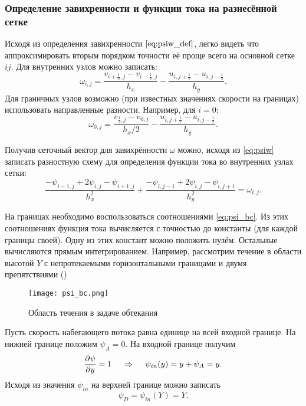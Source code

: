 \subsubsection{Определение завихренности и функции тока на разнесённой сетке}

Исходя из определения завихренности $\eqref{eq:psiw_def}$, легко видеть
что аппроксимировать вторым порядком точности её проще всего на основной сетке $ij$.
Для внутренних узлов можно записать:
\begin{equation}
    \label{eq:omega_approx}
    \omega_{i,j} = \frac{v_{i+\tfrac12,j} - v_{i-\tfrac12,j}}{h_x}
                 - \frac{u_{i, j+\tfrac12} - u_{i, j-\tfrac12}}{h_y}.
\end{equation}
Для граничных узлов возможно (при известных значениях скорости на границах) использовать направленные разности.
Например, для $i=0$:
\begin{equation}
    \label{eq:omega_approx_bc}
    \omega_{0,j} = \frac{v_{\tfrac12,j} - v_{0,j}}{h_x/2}
                 - \frac{u_{i, j+\tfrac12} - u_{i, j-\tfrac12}}{h_y}.
\end{equation}

Получив сеточный вектор для завихрённости ${\omega}$
можно, исходя из \eqref{eq:psiw} записать разностную схему для 
определения функции тока во внутренних узлах сетки:
\begin{equation}
    \label{eq:psi_slae}
    \frac{-\psi_{i-1,j} + 2\psi_{i,j} - \psi_{i+1,j}}{h_x^2} +
    \frac{-\psi_{i,j-1} + 2\psi_{i,j} - \psi_{i,j+1}}{h_y^2} 
    = \omega_{i,j}.
\end{equation}

На границах необходимо воспользоваться соотношениями \eqref{eq:psi_bc}.
Из этих соотношениях функция тока вычисляется с точностью до константы (для каждой границы своей).
Одну из этих констант можно положить нулём.
Остальные вычисляются прямым интегрированием.
Например, рассмотрим течение в области высотой $Y$ с непротекаемыми горизонтальными границами и двумя препятствиями ()

\begin{figure}[h]
\centering
\texttt{[image: psi\_bc.png]}
\caption{Область течения в задаче обтекания}
\label{fig:psi_bc}
\end{figure}

Пусть скорость набегающего потока равна единице на всей входной границе.
На нижней границе положим $\psi_A=0$.
На входной границе получим
\begin{equation}
    \frac{\partial \psi}{\partial y} = 1 \; \quad\Rightarrow\quad \; \psi_{in}(y) = y + \psi_A = y.
\end{equation}
Исходя из значения $\psi_{in}$ на верхней границе можно записать
\begin{equation*}
    \psi_D = \psi_{in}(Y) = Y.
\end{equation*}

